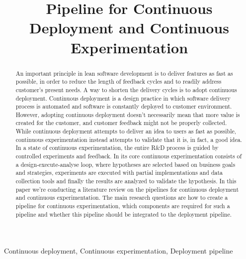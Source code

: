 \documentclass[conference]{IEEEtran}
\begin{document}
\title{Pipeline for Continuous Deployment and Continuous Experimentation}

\author{
}

\maketitle

\begin{abstract}
An important principle in lean software development is to deliver features as fast as possible, in order to reduce the length of feedback cycles and to readily address customer's present needs. A way to shorten the delivery cycles is to adopt continuous deployment. Continuous deployment is a design practice in which software delivery process is automated and software is constantly deployed to customer environment. However, adopting continuous deployment doesn't necessarily mean that more value is created for the customer, and customer feedback might not be properly collected. While continuous deployment attempts to deliver an idea to users as fast as possible, continuous experimentation instead attempts to validate that it is, in fact, a good idea. In a state of continuous experimentation, the entire R\&D process is guided by controlled experiments and feedback. In its core continuous experimentation consists of a design-execute-analyse loop, where hypotheses are selected based on business goals and strategies, experiments are executed with partial implementations and data collection tools and finally the results are analyzed to validate the hypothesis. In this paper we're conducting a literature review on the pipelines for continuous deployment and continuous experimentation. The main research questions are how to create a pipeline for continuous experimentation, which components are required for such a pipeline and whether this pipeline should be integrated to the deployment pipeline. 
\end{abstract}
\begin{IEEEkeywords}
Continuous deployment, Continuous experimentation, Deployment pipeline
\end{IEEEkeywords}
\end{document}
